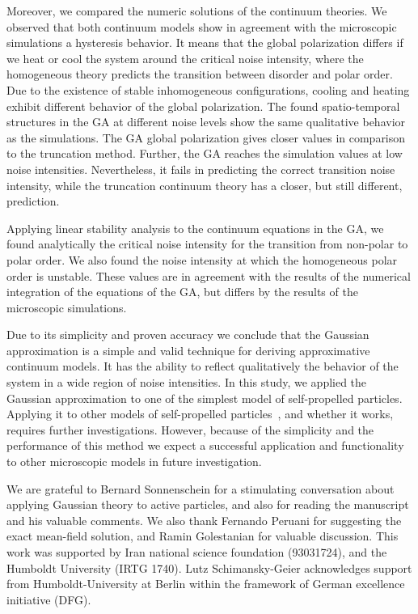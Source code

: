 \documentclass[reprint,floatfix,amsmath,amssymb,aps,pre,showkeys,showpacs,superscriptaddress]{revtex4-1}
\begin{document}
Moreover, we compared the numeric solutions of the continuum theories. We observed that both continuum models show in agreement with the microscopic simulations a hysteresis behavior. It means that the global polarization differs if we heat or cool the system around the critical noise intensity, where the homogeneous theory predicts the transition between disorder and polar order. Due to the existence of stable inhomogeneous configurations, cooling and heating exhibit different behavior of the global polarization. The found spatio-temporal structures in the GA at different noise levels show the same qualitative behavior as the simulations. The GA global polarization gives closer values in comparison to the truncation method. Further, the GA reaches the simulation values at low noise intensities. Nevertheless, it fails in predicting the correct transition noise intensity, while the truncation continuum theory has a closer, but still different, prediction.

Applying linear stability analysis to the continuum equations in the GA, we found analytically the critical noise intensity for the transition from non-polar to polar order. We also found the noise intensity at which the homogeneous polar order is unstable. These values are in agreement with the results of the numerical integration of the equations of the GA, but differs by the results of the microscopic simulations.

Due to its simplicity and proven accuracy we conclude that the Gaussian approximation is a simple and valid technique for deriving approximative continuum models. It has the ability to reflect qualitatively the behavior of the system in a wide region of noise intensities. In this study, we applied the Gaussian approximation to one of the simplest model of self-propelled particles. Applying it to other models of self-propelled particles~\cite{Menzel2013unidirectional,Romanczuk2016emergent,Menzel2016on,allaei2016,Chen2013universality,Adhyapak2013live}, and whether it works, requires further investigations. However, because of the simplicity and the performance of this method we expect a successful application and functionality to other microscopic models in future investigation.




\begin{acknowledgments}
We are grateful to Bernard Sonnenschein for a stimulating conversation about applying Gaussian theory to active particles, and also for reading the manuscript and his valuable comments. We also thank Fernando Peruani for suggesting the exact mean-field solution, and Ramin Golestanian for valuable discussion. This work was supported by Iran national science foundation (93031724), and 
the Humboldt University (IRTG 1740). Lutz Schimansky-Geier acknowledges support from Humboldt-University at Berlin within the framework of German excellence initiative (DFG).
\end{acknowledgments}
\end{document}
